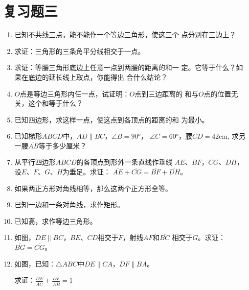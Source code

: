 \section*{复习题三}
\begin{enumerate}
    \item 已知不共线三点，能不能作一个等边三角形，使这三个
    点分别在三边上？
    \item 求证：三角形的三条角平分线相交于一点。
    \item 求证：等腰三角形底边上任意一点到两腰的距离的和一
    定。它等于什么？如果在底边的延长线上取点，你能得出
    合什么结论？
    \item $O$点是等边三角形内任一点，试证明：$O$点到三边距离的
    和与$O$点的位置无关，这个和等于什么？
    \item 已知四边形，求这样一点，使这点到各顶点的距离的和
    为最小。
    \item 已知梯形$ABCD$中，$\overline{AD}\parallel\overline{BC}$，$\angle B=\ang{90}$，
    $\angle C=\ang{60}$，腰$\overline{CD}=42$cm, 求另一腰$\overline{AB}$等于多少厘米？
    \item 从平行四边形$ABCD$的各顶点到形外一条直线作垂线
    $AE$、$BF$，$CG$、$DH$，设$E$、$F$、$G$、$H$为垂足。求证：
    $\overline{AE}+\overline{CG}=\overline{BF}+\overline{DH}$。
    \item 如果两正方形对角线相等，那么这两个正方形全等。
\item 已知一边和一条对角线，求作矩形。
\item 已知高，求作等边三角形。
\item 如图，$DE\parallel BC$，$BE$、$CD$相交于$F$，射线$AF$和$\overline{BC}$
相交于$G$。求证：$\overline{BG}=\overline{CG}$。
\item 如图，已知：$\triangle ABC$中$DE\parallel CA$，$DF\parallel BA$。

求证：$\frac{\overline{DE}}{\overline{AC}}+\frac{\overline{DF}}{\overline{AB}}=1$


\end{enumerate}
